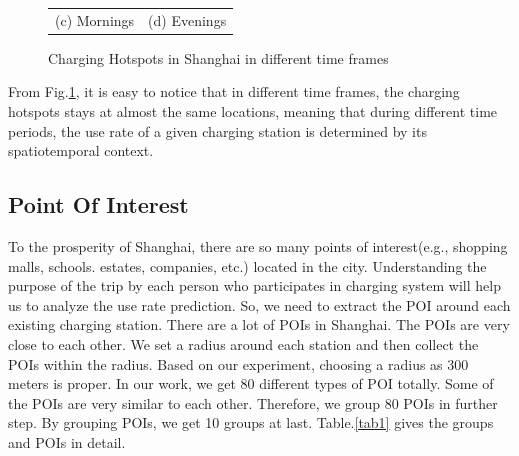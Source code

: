 \begin{figure}[htbp]
\begin{tabular}{cc}
		(c) Mornings & (d) Evenings
	\end{tabular}
	\centering
	\caption{Charging Hotspots in Shanghai in different time frames}
	\label{fig2}
\end{figure}
From Fig.\ref{fig2}, it is easy to notice that in different time frames, the charging hotspots stays at almost the same locations, meaning that during different time periods, the use rate of a given charging station is determined by its spatiotemporal context.

\subsection{Point Of Interest}
To the prosperity of Shanghai, there are so many points of interest(e.g., shopping malls, schools. estates, companies, etc.) located in the city.  Understanding the purpose of the trip by each person who participates in charging system will help us to analyze the use rate prediction. So, we need to extract the POI around each existing charging station. There are a lot of POIs in Shanghai. The POIs are very close to each other. We set a radius around each station and then collect the POIs within the radius. Based on our experiment, choosing a radius as 300 meters is proper. In our work, we get 80 different types of POI totally. Some of the POIs are very similar to each other. Therefore, we group 80 POIs in further step. By grouping POIs, we get 10 groups at last. Table.\ref{tab1} gives the groups and POIs in detail.

